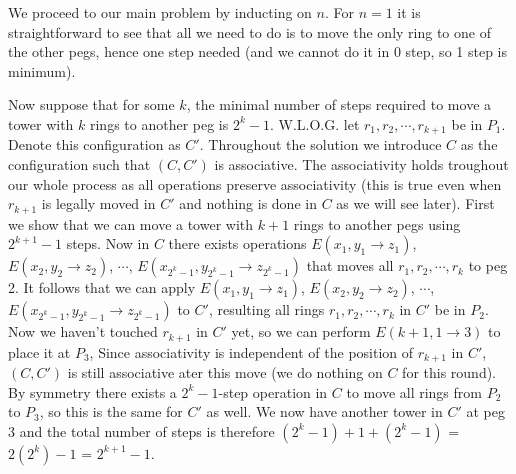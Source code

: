 \documentclass[11pt]{article}
\begin{document}
\begin{enumerate}
We proceed to our main problem by inducting on $n$. For $n=1$ it is straightforward to see that all we need to do is to move the only ring to one of the other pegs, hence one step needed (and we cannot do it in 0 step, so 1 step is minimum).

Now suppose that for some $k$, the minimal number of steps required to move a tower with $k$ rings to another peg is $2^k-1$. W.L.O.G. let $r_1, r_2,\cdots ,r_{k+1}$ be in $P_1$. Denote this configuration as $C'$. Throughout the solution we introduce $C$ as the configuration such that $(C, C')$ is associative. The associativity holds troughout our whole process as all operations preserve associativity (this is true even when $r_{k+1}$ is legally moved in $C'$ and nothing is done in $C$ as we will see later).
First we show that we can move a tower with $k+1$ rings to another pegs using $2^{k+1}-1$ steps. Now in $C$ there exists operations $E(x_1, y_1\to z_1)$, $E(x_2, y_2\to z_2)$, $\cdots$, $E(x_{2^k-1}, y_{2^k-1}\to z_{2^k-1})$ that moves all $r_1, r_2, \cdots , r_k$ to peg 2. It follows that we can apply $E(x_1, y_1\to z_1)$, $E(x_2, y_2\to z_2)$, $\cdots$, $E(x_{2^k-1}, y_{2^k-1}\to z_{2^k-1})$ to $C'$, resulting all rings $r_1, r_2,\cdots ,r_k$ in $C'$ be in $P_2$. Now we haven't touched $r_{k+1}$ in $C'$ yet, so we can perform $E(k+1, 1\to 3)$ to place it at $P_3$, Since associativity is independent of the position of $r_{k+1}$ in $C'$, $(C, C')$ is still associative ater this move (we do nothing on $C$ for this round). By symmetry there exists a $2^k-1$-step operation in $C$ to move all rings from $P_2$ to $P_3$, so this is the same for $C'$ as well. We now have another tower in $C'$ at peg 3 and the total number of steps is therefore $(2^k-1)+1+(2^k-1)$ = $2(2^k)-1$ = $2^{k+1}-1$.


\end{enumerate}
\end{document}
